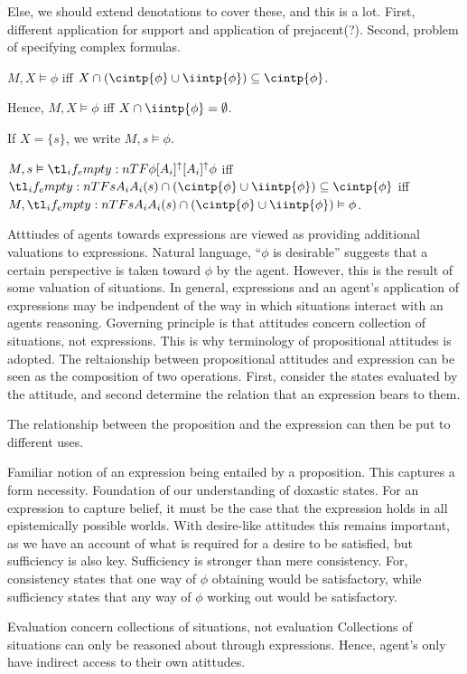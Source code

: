 \documentclass[10pt]{article}
\begin{document}
Else, we should extend denotations to cover these, and this is a lot.
First, different application for support and application of prejacent(?).
Second, problem of specifying complex formulas.

\begin{definition}[Support]
  \(M,X \vDash \phi\) iff \(X \cap (\cintp{\phi} \cup \iintp{\phi}) \subseteq \cintp{\phi}\).

  Hence, \(M,X \vDash \phi\) iff \(X \cap \iintp{\phi} = \emptyset\).

  If \(X = \{s\}\), we write \(M,s \vDash \phi\).

  \(M,s \vDash \lattu{\phi}\) iff \(\fatt{s} \cap (\cintp{\phi} \cup \iintp{\phi}) \subseteq \cintp{\phi}\) iff \(M,\fatt{s} \cap (\cintp{\phi} \cup \iintp{\phi}) \vDash \phi\).
\end{definition}

Atttiudes of agents towards expressions are viewed as providing additional valuations to expressions.
Natural language, ``\(\phi\) is desirable'' suggests that a certain perspective is taken toward \(\phi\) by the agent.
However, this is the result of some valuation of situations.
In general, expressions and an agent's application of expressions may be indpendent of the way in which situations interact with an agents reasoning.
Governing principle is that attitudes concern collection of situations, not expressions.
This is why terminology of propositional attitudes is adopted.
The reltaionship between propositional attitudes and expression can be seen as the composition of two operations.
First, consider the states evaluated by the attitude, and second determine the relation that an expression bears to them.

The relationship between the proposition and the expression can then be put to different uses.

Familiar notion of an expression being entailed by a proposition.
This captures a form necessity.
Foundation of our understanding of doxastic states.
For an expression to capture belief, it must be the case that the expression holds in all epistemically possible worlds.
With desire-like attitudes this remains important, as we have an account of what is required for a desire to be satisfied, but sufficiency is also key.
Sufficiency is stronger than mere consistency.
For, consistency states that one way of \(\phi\) obtaining would be satisfactory, while sufficiency states that any way of \(\phi\) working out would be satisfactory.

Evaluation concern collections of situations, not evaluation
Collections of situations can only be reasoned about through expressions.
Hence, agent's only have indirect access to their own atittudes.
\end{document}
